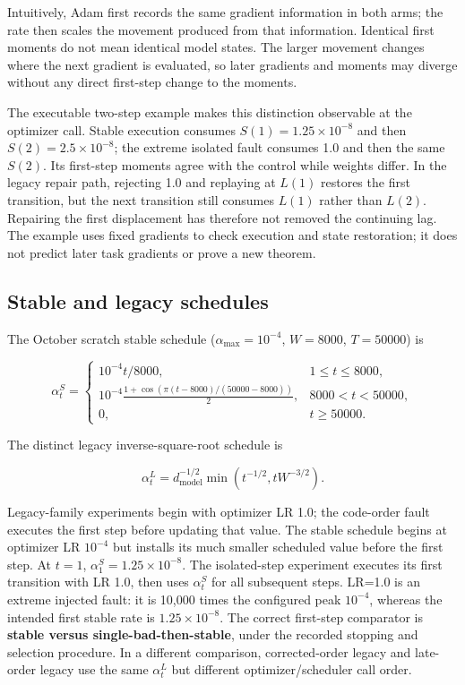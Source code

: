 \documentclass[referee,pdflatex,sn-mathphys-num]{sn-jnl}
\begin{document}
Intuitively, Adam first records the same gradient information in both arms; the rate then scales the movement produced from that information. Identical first moments do not mean identical model states. The larger movement changes where the next gradient is evaluated, so later gradients and moments may diverge without any direct first-step change to the moments.

The executable two-step example makes this distinction observable at the optimizer call. Stable execution consumes \(S(1)=1.25\times10^{-8}\) and then \(S(2)=2.5\times10^{-8}\); the extreme isolated fault consumes 1.0 and then the same \(S(2)\). Its first-step moments agree with the control while weights differ. In the legacy repair path, rejecting 1.0 and replaying at \(L(1)\) restores the first transition, but the next transition still consumes \(L(1)\) rather than \(L(2)\). Repairing the first displacement has therefore not removed the continuing lag. The example uses fixed gradients to check execution and state restoration; it does not predict later task gradients or prove a new theorem.

\subsection{Stable and legacy schedules}\label{stable-and-legacy-schedules}

The October scratch stable schedule (\(\alpha_{\max}=10^{-4}\), \(W=8000\), \(T=50000\)) is

\[
\alpha_t^{S}=\begin{cases}
10^{-4}t/8000,&1\le t\le8000,\\
10^{-4}\frac{1+\cos(\pi(t-8000)/(50000-8000))}{2},&8000<t<50000,\\
0,&t\ge50000.
\end{cases}\tag{3}
\]

The distinct legacy inverse-square-root schedule is

\[
\alpha_t^L=d_{\mathrm{model}}^{-1/2}\min(t^{-1/2},tW^{-3/2}).\tag{4}
\]

Legacy-family experiments begin with optimizer LR 1.0; the code-order fault executes the first step before updating that value. The stable schedule begins at optimizer LR \(10^{-4}\) but installs its much smaller scheduled value before the first step. At \(t=1\), \(\alpha_1^S=1.25\times10^{-8}\). The isolated-step experiment executes its first transition with LR 1.0, then uses \(\alpha_t^S\) for all subsequent steps. LR=1.0 is an extreme injected fault: it is 10,000 times the configured peak \(10^{-4}\), whereas the intended first stable rate is \(1.25\times10^{-8}\). The correct first-step comparator is \textbf{stable versus single-bad-then-stable}, under the recorded stopping and selection procedure. In a different comparison, corrected-order legacy and late-order legacy use the same \(\alpha^L_t\) but different optimizer/scheduler call order.
\end{document}
